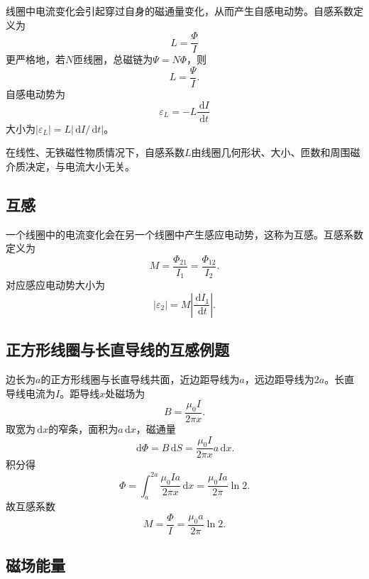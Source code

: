 \documentclass[UTF8,zihao=-4]{ctexart}
\newcommand{\dd}{\,\mathrm d}
\newcommand{\eps}{\varepsilon}
\newcommand{\muz}{\mu_0}
\begin{document}
线圈中电流变化会引起穿过自身的磁通量变化，从而产生自感电动势。自感系数定义为
\begin{equation}
\boxed{L=\frac{\Phi}{I}}
\end{equation}
更严格地，若\(N\)匝线圈，总磁链为\(\Psi=N\Phi\)，则
\begin{equation}
L=\frac{\Psi}{I}.
\end{equation}
自感电动势为
\begin{equation}
\boxed{\eps_L=-L\frac{\dd I}{\dd t}}
\end{equation}
大小为\(|\eps_L|=L|\dd I/\dd t|\)。

\begin{keybox}[自感系数由什么决定]
在线性、无铁磁性物质情况下，自感系数\(L\)由线圈几何形状、大小、匝数和周围磁介质决定，与电流大小无关。
\end{keybox}

\subsection{互感}

一个线圈中的电流变化会在另一个线圈中产生感应电动势，这称为互感。互感系数定义为
\begin{equation}
\boxed{M=\frac{\Phi_{21}}{I_1}=\frac{\Phi_{12}}{I_2}}.
\end{equation}
对应感应电动势大小为
\begin{equation}
|\eps_2|=M\left|\frac{\dd I_1}{\dd t}\right|.
\end{equation}

\subsection{正方形线圈与长直导线的互感例题}

边长为\(a\)的正方形线圈与长直导线共面，近边距导线为\(a\)，远边距导线为\(2a\)。长直导线电流为\(I\)。距导线\(x\)处磁场为
\[
B=\frac{\muz I}{2\pi x}.
\]
取宽为\(\dd x\)的窄条，面积为\(a\dd x\)，磁通量
\[
\dd\Phi=B\dd S=\frac{\muz I}{2\pi x}a\dd x.
\]
积分得
\[
\Phi=\int_a^{2a}\frac{\muz I a}{2\pi x}\dd x
=\frac{\muz I a}{2\pi}\ln 2.
\]
故互感系数
\begin{equation}
\boxed{M=\frac{\Phi}{I}=\frac{\muz a}{2\pi}\ln2}.
\end{equation}

\subsection{磁场能量}
\end{document}
